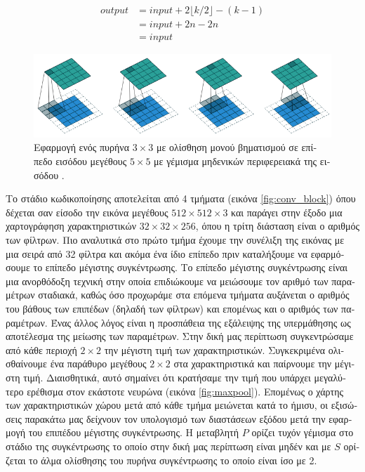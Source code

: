 \begin{equation}
\label{eqn:half_pad}
\begin{align*}
output &= input + 2\lfloor k/2 \rfloor -(k - 1) \\
        &= input + 2n - 2n \\
        &= input
\end{align*}
\end{equation}

\begin{figure}[H]
 \centering
 \includegraphics[scale=0.4]{Images/conv_pad}
  \caption[\textgreek{Συνέλιξη με }Zero-Padding]{\textgreek{Εφαρμογή ενός πυρήνα $3\times3$ με ολίσθηση μονού βηματισμού σε επίπεδο εισόδου μεγέθους $5\times5$ με γέμισμα μηδενικών περιφερειακά της εισόδου} \cite{conv_arithmetic}.}
 \label{fig:conv_pad}
\end{figure}


\textgreek{Το στάδιο κωδικοποίησης αποτελείται από 4 τμήματα (εικόνα }\ref{fig:conv_block})\textgreek{ όπου δέχεται σαν είσοδο την εικόνα μεγέθους $512\times512\times3$ και παράγει στην έξοδο μια χαρτογράφηση χαρακτηριστικών $32\times32\times256$, όπου η τρίτη διάσταση είναι ο αριθμός των φίλτρων. Πιο αναλυτικά στο πρώτο τμήμα έχουμε την συνέλιξη της εικόνας με μια σειρά από 32 φίλτρα και ακόμα ένα ίδιο επίπεδο πριν καταλήξουμε να εφαρμόσουμε το επίπεδο μέγιστης συγκέντρωσης. Το επίπεδο μέγιστης συγκέντρωσης είναι μια ανορθόδοξη τεχνική στην οποία επιδιώκουμε να μειώσουμε τον αριθμό των παραμέτρων σταδιακά, καθώς όσο προχωράμε στα επόμενα τμήματα αυξάνεται ο αριθμός του βάθους των επιπέδων (δηλαδή των φίλτρων) και επομένως και ο αριθμός των παραμέτρων. Ένας άλλος λόγος είναι η προσπάθεια της εξάλειψης της υπερμάθησης ως αποτέλεσμα της μείωσης των παραμέτρων. Στην δική μας περίπτωση συγκεντρώσαμε από κάθε περιοχή $2\times2$ την μέγιστη τιμή των χαρακτηριστικών. Συγκεκριμένα ολισθαίνουμε ένα παράθυρο μεγέθους $2\times2$ στα χαρακτηριστικά και παίρνουμε την μέγιστη τιμή. Διαισθητικά, αυτό σημαίνει ότι κρατήσαμε την τιμή που υπάρχει μεγαλύτερο ερέθισμα στον εκάστοτε νευρώνα (εικόνα }\ref{fig:maxpool}). \textgreek{Επομένως ο χάρτης των χαρακτηριστικών χώρου μετά από κάθε τμήμα μειώνεται κατά το ήμισυ, οι εξισώσεις παρακάτω μας δείχνουν τον υπολογισμό των διαστάσεων εξόδου μετά την εφαρμογή του επιπέδου μέγιστης συγκέντρωσης. Η μεταβλητή $P$ ορίζει τυχόν γέμισμα στο στάδιο της συγκέντρωσης το οποίο στην δική μας περίπτωση είναι μηδέν και με $S$ ορίζεται το άλμα ολίσθησης του πυρήνα συγκέντρωσης το οποίο είναι ίσο με 2.} 


